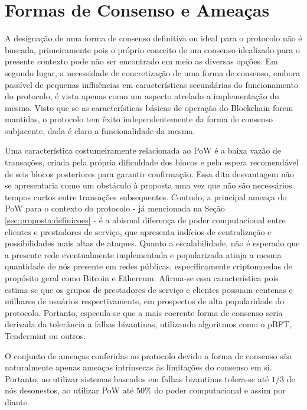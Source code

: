 \section{Formas de Consenso e Ameaças}
\label{sec:ameacas_consenso}

A designação de uma forma de consenso definitiva ou ideal para o protocolo não é buscada, primeiramente pois o próprio conceito de um consenso idealizado para o presente contexto pode não ser encontrado em meio as diversas opções. Em segundo lugar, a necessidade de concretização de uma forma de consenso, embora passível de pequenas influências em características secundárias do funcionamento do protocolo, é vista apenas como um aspecto atrelado a implementação do mesmo. Visto que se as características básicas de operação do Blockchain forem mantidas, o protocolo tem êxito independentemente da forma de consenso subjacente, dada é claro a funcionalidade da mesma.

%
Uma característica costumeiramente relacionada ao \ac{PoW} é a baixa vazão de transações, criada pela própria dificuldade dos blocos e pela espera recomendável de seis blocos posteriores para garantir confirmação. Essa dita desvantagem não se apresentaria como um obstáculo à proposta uma vez que não são necessários tempos curtos entre transações subsequentes. Contudo, a principal ameaça do \ac{PoW} para o contexto do protocolo - já mencionada na Seção \ref{sec:proposta:definicoes} - é a abismal diferença de poder computacional entre clientes e prestadores de serviço, que apresenta indícios de centralização e possibilidades mais altas de ataques. Quanto a escalabilidade, não é esperado que a presente rede eventualmente implementada e popularizada atinja a mesma quantidade de nós presente em redes públicas, especificamente criptomoedas de propósito geral como Bitcoin e Ethereum. Afirma-se essa característica pois estima-se que os grupos de prestadores de serviço e clientes possuam centenas e milhares de usuários respectivamente, em prospectos de alta popularidade do protocolo. Portanto, especula-se que a mais coerente forma de consenso seria derivada da tolerância a falhas bizantinas, utilizando algoritmos como o \ac{pBFT}, Tendermint ou outros.

%
O conjunto de ameaças conferidas ao protocolo devido a forma de consenso são naturalmente apenas ameaças intrínsecas às limitações do consenso em si. Portanto, ao utilizar sistemas baseados em falhas bizantinas tolera-se até $1/3$ de nós desonestos, ao utilizar \ac{PoW} até $50\%$ do poder computacional e assim por diante.

